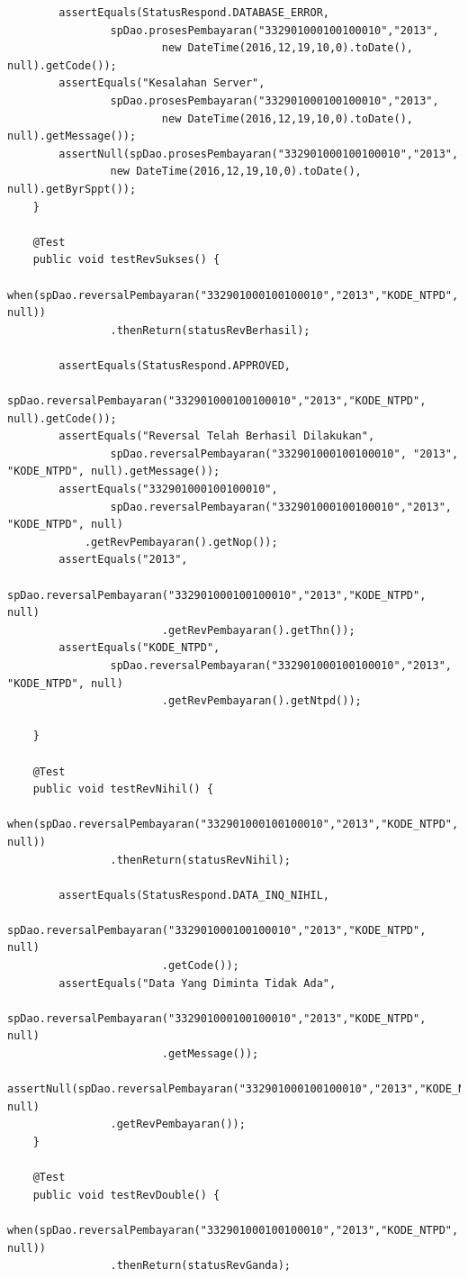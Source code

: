 \documentclass[pdftex,12pt, oneside]{article}
\begin{document}
\begin{enumerate}[A.]
\begin{enumerate}[1.]
\begin{lstlisting}
        assertEquals(StatusRespond.DATABASE_ERROR,
                spDao.prosesPembayaran("332901000100100010","2013",
                        new DateTime(2016,12,19,10,0).toDate(), null).getCode());
        assertEquals("Kesalahan Server",
                spDao.prosesPembayaran("332901000100100010","2013",
                        new DateTime(2016,12,19,10,0).toDate(), null).getMessage());
        assertNull(spDao.prosesPembayaran("332901000100100010","2013",
                new DateTime(2016,12,19,10,0).toDate(), null).getByrSppt());
    }

    @Test
    public void testRevSukses() {
        when(spDao.reversalPembayaran("332901000100100010","2013","KODE_NTPD", null))
                .thenReturn(statusRevBerhasil);

        assertEquals(StatusRespond.APPROVED,
                spDao.reversalPembayaran("332901000100100010","2013","KODE_NTPD", null).getCode());
        assertEquals("Reversal Telah Berhasil Dilakukan",
                spDao.reversalPembayaran("332901000100100010", "2013", "KODE_NTPD", null).getMessage());
        assertEquals("332901000100100010",
                spDao.reversalPembayaran("332901000100100010","2013", "KODE_NTPD", null)
            .getRevPembayaran().getNop());
        assertEquals("2013",
                spDao.reversalPembayaran("332901000100100010","2013","KODE_NTPD", null)
                        .getRevPembayaran().getThn());
        assertEquals("KODE_NTPD",
                spDao.reversalPembayaran("332901000100100010","2013", "KODE_NTPD", null)
                        .getRevPembayaran().getNtpd());

    }

    @Test
    public void testRevNihil() {
        when(spDao.reversalPembayaran("332901000100100010","2013","KODE_NTPD", null))
                .thenReturn(statusRevNihil);

        assertEquals(StatusRespond.DATA_INQ_NIHIL,
                spDao.reversalPembayaran("332901000100100010","2013","KODE_NTPD", null)
                        .getCode());
        assertEquals("Data Yang Diminta Tidak Ada",
                spDao.reversalPembayaran("332901000100100010","2013","KODE_NTPD", null)
                        .getMessage());
        assertNull(spDao.reversalPembayaran("332901000100100010","2013","KODE_NTPD", null)
                .getRevPembayaran());
    }

    @Test
    public void testRevDouble() {
        when(spDao.reversalPembayaran("332901000100100010","2013","KODE_NTPD", null))
                .thenReturn(statusRevGanda);


\end{lstlisting}
\end{enumerate}
\end{enumerate}
\end{document}
